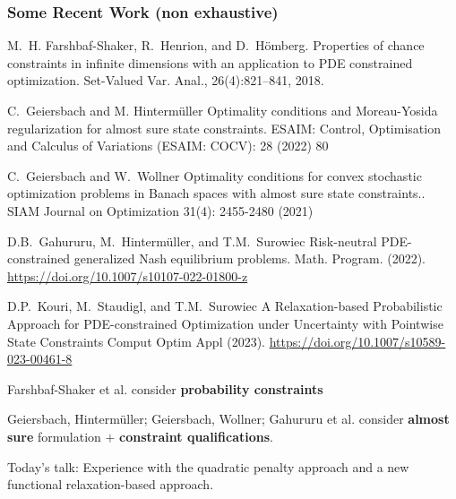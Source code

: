 \documentclass[aspectratio=169,xcolor=dvipsnames,11pt]{beamer}
\begin{document}
\begin{footnotesize}
\begin{frame}\frametitle{Some Recent Work (non exhaustive)}
\begin{thebibliography}{10}\tiny

{\sc M.~H. Farshbaf-Shaker, R.~Henrion, and D.~H\"{o}mberg.}
\newblock Properties of chance constraints in infinite dimensions with an
  application to {PDE} constrained optimization.
\newblock  Set-Valued Var. Anal., 26(4):821--841, 2018.
\vspace{-1ex}

{\sc C.~Geiersbach and M. Hinterm\"uller}
\newblock Optimality conditions and Moreau-Yosida regularization for almost sure state constraints.
\newblock  ESAIM: Control, Optimisation and Calculus of Variations (ESAIM: COCV): 28 (2022) 80
\vspace{-1ex}

{\sc C.~Geiersbach and W.~Wollner}
\newblock Optimality conditions for convex stochastic optimization problems in Banach spaces with almost sure state constraints..
\newblock  SIAM Journal on Optimization 31(4): 2455-2480 (2021)
\vspace{-1ex}

{\sc D.B.~Gahururu, M.~Hinterm\"uller, and T.M.~Surowiec}
\newblock Risk-neutral PDE-constrained generalized Nash equilibrium problems. 
\newblock Math. Program. (2022). \url{https://doi.org/10.1007/s10107-022-01800-z}

{\sc D.P.~Kouri, M.~Staudigl, and T.M.~Surowiec}
\newblock A Relaxation-based Probabilistic Approach for PDE-constrained Optimization under Uncertainty with Pointwise  State Constraints
\newblock Comput Optim Appl (2023). \url{https://doi.org/10.1007/s10589-023-00461-8}
\end{thebibliography}
\begin{block}{}

\begin{itemize} {\tiny
\item Farshbaf-Shaker et al. consider \textbf{probability constraints}
\item Geiersbach, Hinterm\"uller; Geiersbach, Wollner; Gahururu et al. consider \textbf{almost sure} formulation $+$ \textbf{constraint qualifications}.\vspace{-1ex}
\item Today's talk: Experience with the quadratic penalty approach and a new functional relaxation-based approach.
}
\end{itemize}
\end{block}
\end{frame}


\end{footnotesize}
\end{document}
